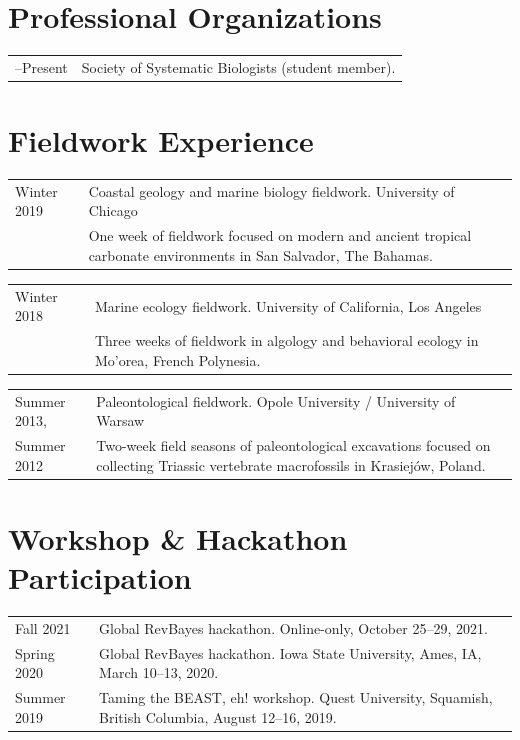 \documentclass[10pt]{article}
\begin{document}
\section*{Professional Organizations}

\begin{tabularx}{\textwidth}{>{\raggedleft\arraybackslash}p{2.2cm} X}
2017--Present & Society of Systematic Biologists (student member).
\end{tabularx}

\section*{Fieldwork Experience}

\begin{tabularx}{\textwidth}{>{\raggedleft\arraybackslash}p{2.2cm} X}
Winter 2019 & Coastal geology and marine biology fieldwork. University of Chicago \\
& One week of fieldwork focused on modern and ancient tropical carbonate environments in San Salvador, The Bahamas.
\end{tabularx}
\begin{tabularx}{\textwidth}{>{\raggedleft\arraybackslash}p{2.2cm} X}
Winter 2018 & Marine ecology fieldwork. University of California, Los Angeles \\
& Three weeks of fieldwork in algology and behavioral ecology in Mo'orea, French Polynesia.
\end{tabularx}
\begin{tabularx}{\textwidth}{>{\raggedleft\arraybackslash}p{2.2cm} X}
Summer 2013, & Paleontological fieldwork. Opole University / University of Warsaw \\
Summer 2012 & Two-week field seasons of paleontological excavations focused on collecting Triassic vertebrate macrofossils in Krasiej\'{o}w, Poland.
\end{tabularx}

\section*{Workshop \& Hackathon Participation}

\begin{tabularx}{\textwidth}{>{\raggedleft\arraybackslash}p{2.2cm} X}
Fall 2021 & Global \textsf{RevBayes} hackathon. Online-only, October 25--29, 2021. \\[0.1cm]
Spring 2020 & Global \textsf{RevBayes} hackathon. Iowa State University, Ames, IA, March 10--13, 2020. \\[0.1cm]
Summer 2019 & Taming the BEAST, eh! workshop. Quest University, Squamish, British Columbia, August 12--16, 2019.
\end{tabularx}
\end{document}
